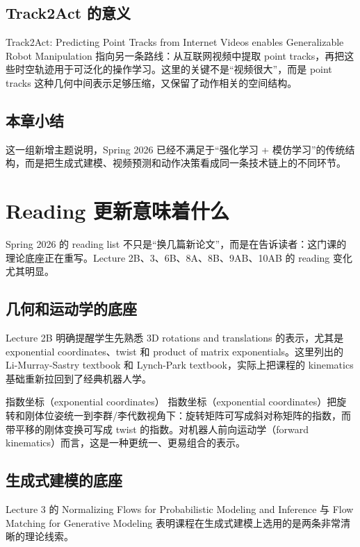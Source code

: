 \documentclass[a4paper]{article}
\begin{document}
\subsection{Track2Act 的意义}

Track2Act: Predicting Point Tracks from Internet Videos enables Generalizable Robot Manipulation 指向另一条路线：从互联网视频中提取 point tracks，再把这些时空轨迹用于可泛化的操作学习。这里的关键不是“视频很大”，而是 point tracks 这种几何中间表示足够压缩，又保留了动作相关的空间结构。

\subsection{本章小结}

这一组新增主题说明，Spring 2026 已经不满足于“强化学习 + 模仿学习”的传统结构，而是把生成式建模、视频预测和动作决策看成同一条技术链上的不同环节。

\section{Reading 更新意味着什么}

Spring 2026 的 reading list 不只是“换几篇新论文”，而是在告诉读者：这门课的理论底座正在重写。Lecture 2B、3、6B、8A、8B、9AB、10AB 的 reading 变化尤其明显。

\subsection{几何和运动学的底座}

Lecture 2B 明确提醒学生先熟悉 3D rotations and translations 的表示，尤其是 exponential coordinates、twist 和 product of matrix exponentials。这里列出的 Li-Murray-Sastry textbook 和 Lynch-Park textbook，实际上把课程的 kinematics 基础重新拉回到了经典机器人学。

\begin{knowledgebox}{指数坐标（exponential coordinates）}
指数坐标（exponential coordinates）把旋转和刚体位姿统一到李群/李代数视角下：旋转矩阵可写成斜对称矩阵的指数，而带平移的刚体变换可写成 twist 的指数。对机器人前向运动学（forward kinematics）而言，这是一种更统一、更易组合的表示。
\end{knowledgebox}

\subsection{生成式建模的底座}

Lecture 3 的 Normalizing Flows for Probabilistic Modeling and Inference 与 Flow Matching for Generative Modeling 表明课程在生成式建模上选用的是两条非常清晰的理论线索。
\end{document}
